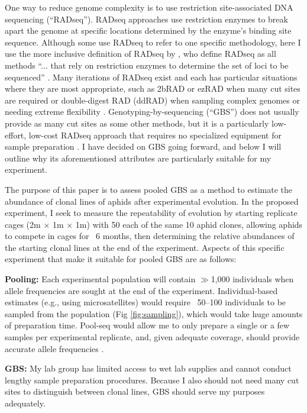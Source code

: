 One way to reduce genome complexity is to use restriction site-associated DNA 
sequencing (``RADseq'').
RADseq approaches use restriction enzymes to break apart the genome at specific 
locations determined by the enzyme's binding site sequence.
Although some use RADseq to refer to one specific methodology, here I use the more
inclusive definition of RADseq by
\citet{Andrews:2016bc}, who define RADseq as all methods 
``... that rely on restriction enzymes to determine the set of loci to be sequenced''
\citep[p 81]{Andrews:2016bc}.
Many iterations of RADseq exist and each has particular situations where they are most 
appropriate, such as 2bRAD or ezRAD when many cut sites are required or double-digest RAD
(ddRAD) when sampling complex genomes or needing extreme flexibility 
\citep{Andrews:2016bc}.
Genotyping-by-sequencing (``GBS'') does not usually provide as many cut sites as some 
other methods, but it is a particularly low-effort, low-cost RADseq approach
that requires no specialized equipment for sample preparation \citep{Elshire:2011gn}.
I have decided on GBS going forward, and below I will outline why its aforementioned
attributes are particularly suitable for my experiment.

The purpose of this paper is to assess pooled GBS as a method to estimate the abundance 
of clonal lines of aphids after experimental evolution.
In the proposed experiment, I seek to measure the repeatability of evolution by 
starting replicate cages (2m $\times$ 1m $\times$ 1m) with 50 each of the same 10 aphid
clones, allowing aphids to compete in cages for ~6 months, then determining the relative
abundances of the starting clonal lines at the end of the experiment.
Aspects of this specific experiment that make it suitable for pooled GBS are as follows:

\textbf{Pooling:}
Each experimental population will contain $\gg$1,000 individuals when allele frequencies 
are sought at the end of the experiment. Individual-based estimates (e.g., using 
microsatellites) would require ~50--100  individuals to be sampled from the population 
(Fig \ref{fig:sampling}), which would take huge amounts of preparation time. Pool-seq 
would allow me to only prepare a single or a few samples per  experimental 
replicate, and, given adequate coverage, should provide accurate allele frequencies 
\citep{Schlotterer:2014dk}.

\textbf{GBS:}
My lab group has limited access to wet lab supplies and cannot conduct lengthy sample
preparation procedures.
Because I also should not need many cut sites to distinguish between clonal lines, GBS
should serve my purposes adequately.


